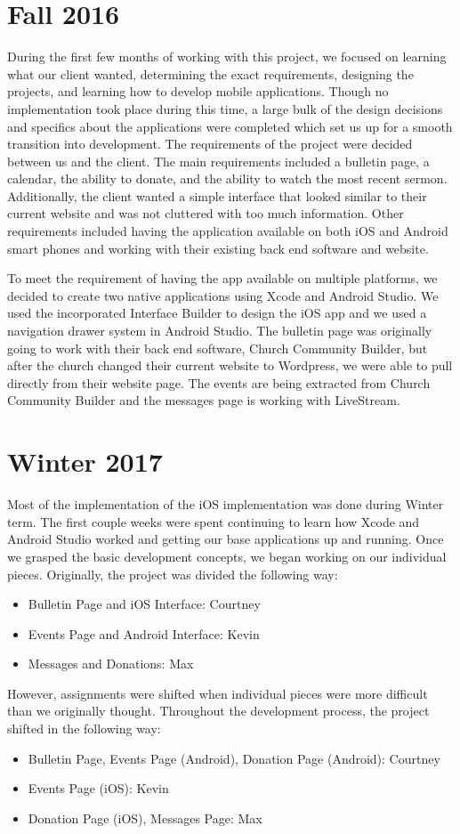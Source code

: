 \documentclass[letterpaper,10pt,draftclsnofoot,onecolumn,titlepage]{IEEEtran}
\begin{document}
\section{Fall 2016}
		During the first few months of working with this project, we focused on learning what our client wanted, determining the exact requirements, designing the projects, and learning how to develop mobile applications.
		 Though no implementation took place during this time, a large bulk of the design decisions and specifics about the applications were completed which set us up for a smooth transition into development.
		The requirements of the project were decided between us and the client.
		The main requirements included a bulletin page, a calendar, the ability to donate, and the ability to watch the most recent sermon.
		Additionally, the client wanted a simple interface that looked similar to their current website and was not cluttered with too much information.
		Other requirements included having the application available on both iOS and Android smart phones and working with their existing back end software and website.

		To meet the requirement of having the app available on multiple platforms, we decided to create two native applications using Xcode and Android Studio.
		We used the incorporated Interface Builder to design the iOS app and we used a navigation drawer system in Android Studio.
		The bulletin page was originally going to work with their back end software, Church Community Builder, but after the church changed their current website to Wordpress, we were able to pull directly from their website page.
		The events are being extracted from Church Community Builder and the messages page is working with LiveStream.


\section{Winter 2017}
		Most of the implementation of the iOS implementation was done during Winter term.
		The first couple weeks were spent continuing to learn how Xcode and Android Studio worked and getting our base applications up and running.
		Once we grasped the basic development concepts, we began working on our individual pieces.
		Originally, the project was divided the following way:
		\begin {itemize}
			\item Bulletin Page and iOS Interface: Courtney
			\item Events Page and Android Interface: Kevin
			\item Messages and Donations: Max
		\end {itemize}
		However, assignments were shifted when individual pieces were more difficult than we originally thought.
		Throughout the development process, the project shifted in the following way:
		\begin {itemize}
			\item Bulletin Page, Events Page (Android), Donation Page (Android): Courtney
			\item Events Page (iOS): Kevin
			\item Donation Page (iOS), Messages Page: Max
		\end {itemize}
\end{document}
